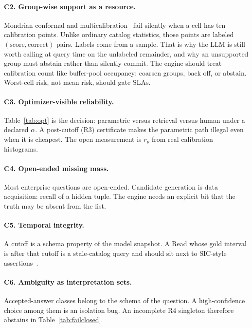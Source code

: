 \documentclass[sigconf, nonacm]{acmart}
\begin{document}
\paragraph{C2. Group-wise support as a resource.}
Mondrian conformal and multicalibration~\cite{detommaso2024multicalibration,gibbs2024conformal} fail silently when a cell has ten calibration points. Unlike ordinary catalog statistics, those points are labeled $(\mathrm{score},\mathrm{correct})$ pairs. Labels come from a sample. That is why the LLM is still worth calling at query time on the unlabeled remainder, and why an unsupported group must abstain rather than silently commit. The engine should treat calibration count like buffer-pool occupancy: coarsen groups, back off, or abstain. Worst-cell risk, not mean risk, should gate SLAs.

\paragraph{C3. Optimizer-visible reliability.}
Table~\ref{tab:opt} is the decision: parametric versus retrieval versus human under a declared $\alpha$. A post-cutoff (R3) certificate makes the parametric path illegal even when it is cheapest. The open measurement is $r_p$ from real calibration histograms.

\paragraph{C4. Open-ended missing mass.}
Most enterprise questions are open-ended. Candidate generation is data acquisition: recall of a hidden tuple. The engine needs an explicit bit that the truth may be absent from the list.

\paragraph{C5. Temporal integrity.}
A cutoff is a schema property of the model snapshot. A Read whose gold interval is after that cutoff is a stale-catalog query and should sit next to SIC-style assertions~\cite{lee2025sic}.

\paragraph{C6. Ambiguity as interpretation sets.}
Accepted-answer classes belong to the schema of the question. A high-confidence choice among them is an isolation bug. An incomplete R4 singleton therefore abstains in Table~\ref{tab:failclosed}.
\end{document}

